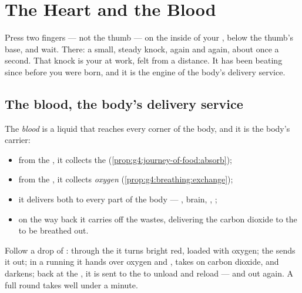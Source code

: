 \chapter{The Heart and the Blood}\label{ch:g4:heart-and-blood}

Press two fingers --- not the thumb --- on the inside of your
, below the thumb's base, and wait. There: a small, steady
knock, again and again, about once a second. That knock is your
 at work, felt from a distance. It has been beating since
before you were born, and it is the engine of the body's
delivery service.

\section{The blood, the body's delivery service}

\begin{proposition}\label{prop:g4:heart-and-blood:carries}
The \emph{blood} is a liquid that reaches every
corner of the body, and it is the body's carrier:
\begin{itemize}
  \item from the , it collects the
        \emph{} (\cref{prop:g4:journey-of-food:absorb});
  \item from the , it collects \emph{oxygen}
        (\cref{prop:g4:breathing:exchange});
  \item it delivers both to every part of the body --- ,
        brain, , ;
  \item on the way back it carries off the wastes, delivering
        the carbon dioxide to the  to be breathed out.
\end{itemize}
\end{proposition}
\admitted

\begin{example}\label{ex:g4:heart-and-blood:round}
Follow a drop of : through the  it turns bright red,
loaded with oxygen; the  sends it out; in a running 
 it hands over oxygen and , takes on carbon
dioxide, and darkens; back at the , it is sent to the
 to unload and reload --- and out again. A full round
takes well under a minute.
\end{example}

